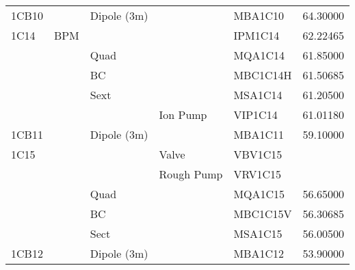 \begin{table}[hp]
\begin{tabular}{lllllr}
1CB10 && Dipole (3m) && MBA1C10 & 64.30000 \\
1C14 & BPM &&& IPM1C14 & 62.22465 \\
&& Quad && MQA1C14 & 61.85000 \\
&& BC && MBC1C14H & 61.50685 \\
&& Sext && MSA1C14 & 61.20500 \\
&&& Ion Pump & VIP1C14 & 61.01180 \\
1CB11 && Dipole (3m) && MBA1C11 & 59.10000 \\
1C15 &&& Valve & VBV1C15 & \\
&&& Rough Pump & VRV1C15 & \\
&& Quad && MQA1C15 & 56.65000 \\
&& BC && MBC1C15V & 56.30685 \\
&& Sect && MSA1C15 & 56.00500 \\
1CB12 && Dipole (3m) && MBA1C12 & 53.90000 \\ \hline 
\end{tabular}
\end{table}

